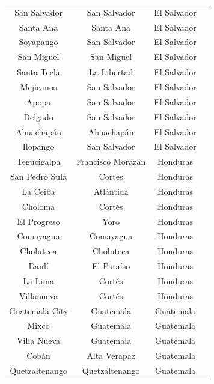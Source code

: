 \documentclass[letterpaper,12pt]{article}
\begin{document}
\begin{longtable}{c c c c }
San Salvador             & San Salvador         & El Salvador \\
Santa Ana                & Santa Ana            & El Salvador \\
Soyapango                & San Salvador         & El Salvador \\
San Miguel               & San Miguel           & El Salvador \\
Santa Tecla              & La Libertad          & El Salvador \\
Mejicanos                & San Salvador         & El Salvador \\
Apopa                    & San Salvador         & El Salvador \\
Delgado                  & San Salvador         & El Salvador \\
Ahuachapán               & Ahuachapán           & El Salvador \\
Ilopango                 & San Salvador         & El Salvador \\
Tegucigalpa              & Francisco Morazán    & Honduras    \\
San Pedro Sula           & Cortés               & Honduras    \\
La Ceiba                 & Atlántida            & Honduras    \\
Choloma                  & Cortés               & Honduras    \\
El Progreso              & Yoro                 & Honduras    \\
Comayagua                & Comayagua            & Honduras    \\
Choluteca                & Choluteca            & Honduras    \\
Danlí                    & El Paraíso           & Honduras    \\
La Lima                  & Cortés               & Honduras    \\
Villanueva               & Cortés               & Honduras    \\
Guatemala City           & Guatemala            & Guatemala   \\
Mixco                    & Guatemala            & Guatemala   \\
Villa Nueva              & Guatemala            & Guatemala   \\
Cobán                    & Alta Verapaz         & Guatemala   \\
Quetzaltenango           & Quetzaltenango       & Guatemala   \\

\end{longtable}
\end{document}
